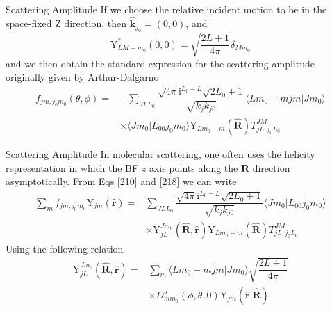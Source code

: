 \documentclass{beamer}
\begin{document}
	\begin{frame}{Scattering Amplitude}
		If we choose the relative incident motion to be in the space-fixed Z direction, then $\hat{\mathbf{k}}_{j_0}=(0,0)$, and
		\begin{equation}
			\mathrm{Y}^*_{LM-m_0}(0,0)=\sqrt{\dfrac{2L+1}{4\pi}}\delta_{Mm_0}
		\end{equation}
		and we then obtain the standard expression for the scattering amplitude originally given by Arthur-Dalgarno
		\begin{align}
			f_{jm,j_0m_0}(\theta,\phi)=&-\sum\limits_{JLL_0}\dfrac{\sqrt{4\pi}\mathrm{i}^{L_0-L}\sqrt{2L_0+1}}{\sqrt{k_jk_{j0}}}\langle Lm_0-mjm|Jm_0\rangle\nonumber\\
			&\times\langle Jm_0|L_00j_0m_0\rangle\mathrm{Y}_{Lm_0-m}(\hat{\mathbf{R}})T^{JM}_{jL,j_0L_0}
			\label{218}
		\end{align}
	\end{frame}
	\begin{frame}{Scattering Amplitude}
		In molecular scattering, one often uses the helicity representation in which the BF $z$ axis points along the $\mathbf{R}$ direction asymptotically. From Eqs \eqref{210} and \eqref{218} we can write
		\begin{align}
			\sum\limits_m	f_{jm,j_0m_0}\mathrm{Y}_{jm}(\hat{\mathbf{r}})=&\sum\limits_{JLL_0}\dfrac{\sqrt{4\pi}\mathrm{i}^{L_0-L}\sqrt{2L_0+1}}{\sqrt{k_jk_{j0}}}\langle Jm_0|L_00j_0m_0\rangle\nonumber\\
			&\times\mathrm{Y}^{Jm_0}_{jL}(\hat{\mathbf{R}},\hat{\mathbf{r}})\mathrm{Y}_{Lm_0-m}(\hat{\mathbf{R}})T^{JM}_{jL,j_0L_0}
			\label{219}
		\end{align}
		Using the following relation
		\begin{align}
			\mathrm{Y}^{Jm_0}_{jL}(\hat{\mathbf{R}},\hat{\mathbf{r}})=&\sum\limits_m\langle Lm_0-mjm|Jm_0\rangle\sqrt{\dfrac{2L+1}{4\pi}}\nonumber\\
			&\times D^J_{mm_0}(\phi,\theta,0)\mathrm{Y}_{jm}(\hat{\mathbf{r}}|\hat{\mathbf{R}})
		\end{align}
		
	\end{frame}
\end{document}

